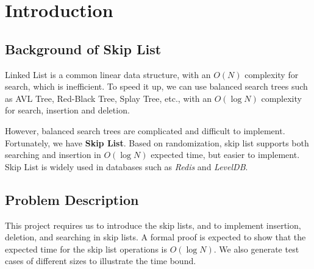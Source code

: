\section{Introduction}
\subsection{Background of Skip List}
Linked List is a common linear data structure, with an $O(N)$ complexity for search, which is inefficient. To speed it up, we can use balanced search trees such as AVL Tree, Red-Black Tree, Splay Tree, etc., with an $O(\log{N})$ complexity for search, insertion and deletion.\par
However, balanced search trees are complicated and difficult to implement. Fortunately, we have \textbf{Skip List}. Based on randomization, skip list supports both searching and insertion in $O(\log{N})$ expected time, but easier to implement. Skip List is widely used in databases such as \textit{Redis} and \textit{LevelDB}.
\subsection{Problem Description}
This project requires us to introduce the skip lists, and to implement insertion, deletion, and searching in skip lists. A formal proof is expected to show that the expected time for the skip list operations is $O(\log{N})$. We also generate test cases of different sizes to illustrate the time bound.